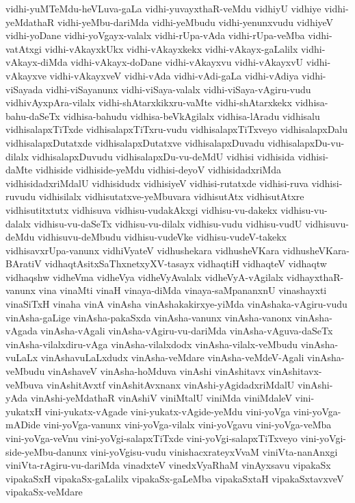 {vidhi-yuMTeMdu-heVLuva-gaLa
vidhi-yuvayxthaR-veMdu
vidhiyU
vidhiye
vidhi-yeMdathaR
vidhi-yeMbu-dariMda
vidhi-yeMbudu
vidhi-yenunxvudu
vidhiyeV
vidhi-yoDane
vidhi-yoVgayx-valalx
vidhi-rUpa-vAda
vidhi-rUpa-veMba
vidhi-vatAtxgi
vidhi-vAkayxkUkx
vidhi-vAkayxkekx
vidhi-vAkayx-gaLalilx
vidhi-vAkayx-diMda
vidhi-vAkayx-doDane
vidhi-vAkayxvu
vidhi-vAkayxvU
vidhi-vAkayxve
vidhi-vAkayxveV
vidhi-vAda
vidhi-vAdi-gaLa
vidhi-vAdiya
vidhi-viSayada
vidhi-viSayanunx
vidhi-viSaya-valalx
vidhi-viSaya-vAgiru-vudu
vidhivAyxpAra-vilalx
vidhi-shAtarxkikxru-vaMte
vidhi-shAtarxkekx
vidhisa-bahu-daSeTx
vidhisa-bahudu
vidhisa-beVkAgilalx
vidhisa-lAradu
vidhisalu
vidhisalapxTiTxde
vidhisalapxTiTxru-vudu
vidhisalapxTiTxveyo
vidhisalapxDalu
vidhisalapxDutatxde
vidhisalapxDutatxve
vidhisalapxDuvadu
vidhisalapxDu-vu-dilalx
vidhisalapxDuvudu
vidhisalapxDu-vu-deMdU
vidhisi
vidhisida
vidhisi-daMte
vidhiside
vidhiside-yeMdu
vidhisi-deyoV
vidhisidadxriMda
vidhisidadxriMdalU
vidhisidudx
vidhisiyeV
vidhisi-rutatxde
vidhisi-ruva
vidhisi-ruvudu
vidhisilalx
vidhisutatxve-yeMbuvara
vidhisutAtx
vidhisutAtxre
vidhisutitxtutx
vidhisuva
vidhisu-vudakAkxgi
vidhisu-vu-dakekx
vidhisu-vu-dalalx
vidhisu-vu-daSeTx
vidhisu-vu-dilalx
vidhisu-vudu
vidhisu-vudU
vidhisuvu-deMdu
vidhisuvu-deMbudu
vidhisu-vudeVke
vidhisu-vudeV-takekx
vidhisavxrUpa-vanunx
vidhiVyateV
vidhushekara
vidhusheVKara
vidhusheVKara-BAratiV
vidhaqtAsitxSaThxnetxyXV-tasayx
vidhaqtiH
vidhaqteV
vidhaqtw
vidhaqshw
vidheVma
vidheVya
vidheVyAvalalx
vidheVyA-vAgilalx
vidhayxthaR-vanunx
vina
vinaMti
vinaH
vinaya-diMda
vinaya-saMpananxnU
vinashayxti
vinaSiTxH
vinaha
vinA
vinAsha
vinAshakakirxye-yiMda
vinAshaka-vAgiru-vudu
vinAsha-gaLige
vinAsha-pakaSxda
vinAsha-vanunx
vinAsha-vanonx
vinAsha-vAgada
vinAsha-vAgali
vinAsha-vAgiru-vu-dariMda
vinAsha-vAguva-daSeTx
vinAsha-vilalxdiru-vAga
vinAsha-vilalxdodx
vinAsha-vilalx-veMbudu
vinAsha-vuLaLx
vinAshavuLaLxdudx
vinAsha-veMdare
vinAsha-veMdeV-Agali
vinAsha-veMbudu
vinAshaveV
vinAsha-hoMduva
vinAshi
vinAshitavx
vinAshitavx-veMbuva
vinAshitAvxtf
vinAshitAvxnanx
vinAshi-yAgidadxriMdalU
vinAshi-yAda
vinAshi-yeMdathaR
vinAshiV
viniMtalU
viniMda
viniMdaleV
vini-yukatxH
vini-yukatx-vAgade
vini-yukatx-vAgide-yeMdu
vini-yoVga
vini-yoVga-mADide
vini-yoVga-vanunx
vini-yoVga-vilalx
vini-yoVgavu
vini-yoVga-veMba
vini-yoVga-veVnu
vini-yoVgi-salapxTiTxde
vini-yoVgi-salapxTiTxveyo
vini-yoVgi-side-yeMbu-danunx
vini-yoVgisu-vudu
vinishacxrateyxVvaM
viniVta-nanAnxgi
viniVta-rAgiru-vu-dariMda
vinadxteV
vinedxVyaRhaM
vinAyxsavu
vipakaSx
vipakaSxH
vipakaSx-gaLalilx
vipakaSx-gaLeMba
vipakaSxtaH
vipakaSxtavxveV
vipakaSx-veMdare
}
